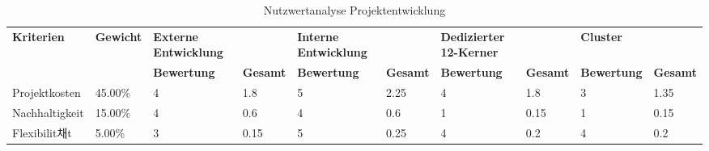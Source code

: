 \begin{table}[!htp]
\centering
\caption{Nutzwertanalyse Projektentwicklung}
\label{nwa_projektentwicklung}
\begin{tabular}{llllllllll}
\rowcolor[HTML]{9698ED}
{\color[HTML]{FFFFFF} \textbf{Kriterien}} & {\color[HTML]{FFFFFF} \textbf{Gewicht}} & {\color[HTML]{FFFFFF} \textbf{Externe Entwicklung}} & {\color[HTML]{FFFFFF} \textbf{}}       & {\color[HTML]{FFFFFF} \textbf{Interne Entwicklung}} & {\color[HTML]{FFFFFF} \textbf{}}       & {\color[HTML]{FFFFFF} \textbf{Dedizierter 12-Kerner}} & {\color[HTML]{FFFFFF} \textbf{}}       & {\color[HTML]{FFFFFF} \textbf{Cluster}}   & {\color[HTML]{FFFFFF} \textbf{}}       \\
\rowcolor[HTML]{9698ED}
{\color[HTML]{FFFFFF} \textbf{}}          & {\color[HTML]{FFFFFF} \textbf{}}        & {\color[HTML]{FFFFFF} \textbf{Bewertung}}           & {\color[HTML]{FFFFFF} \textbf{Gesamt}} & {\color[HTML]{FFFFFF} \textbf{Bewertung}}           & {\color[HTML]{FFFFFF} \textbf{Gesamt}} & {\color[HTML]{FFFFFF} \textbf{Bewertung}}             & {\color[HTML]{FFFFFF} \textbf{Gesamt}} & {\color[HTML]{FFFFFF} \textbf{Bewertung}} & {\color[HTML]{FFFFFF} \textbf{Gesamt}} \\
Projektkosten                             & 45.00\%                                 & 4                                                   & 1.8                                    & 5                                                   & 2.25                                   & 4                                                     & 1.8                                    & 3                                         & 1.35                                   \\
\rowcolor[HTML]{BBDAFF}
Nachhaltigkeit                            & 15.00\%                                 & 4                                                   & 0.6                                    & 4                                                   & 0.6                                    & 1                                                     & 0.15                                   & 1                                         & 0.15                                   \\
Flexibilit채t                              & 5.00\%                                  & 3                                                   & 0.15                                   & 5                                                   & 0.25                                   & 4                                                     & 0.2                                    & 4                                         & 0.2                                    \\

\end{tabular}
\end{table}

